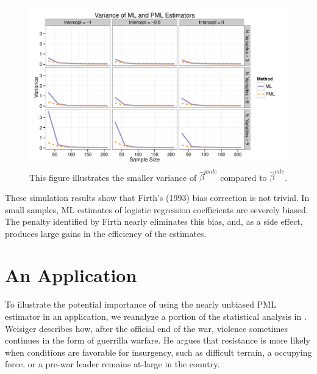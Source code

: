 \documentclass[12pt]{article}
\begin{document}
\begin{figure}[h]
\begin{center}
\includegraphics[width = \textwidth]{figs/sims-var.pdf}
\caption{This figure illustrates the smaller variance of $\hat{\beta}^{pmle}$ compared to $\hat{\beta}^{mle}$.}\label{fig:sims-var}
\end{center}
\end{figure}

These simulation results show that Firth's (1993) bias correction is not trivial. 
In small samples, ML estimates of logistic regression coefficients are severely biased.
The penalty identified by Firth nearly eliminates this bias, and, as a side effect, produces large gains in the efficiency of the estimates. 

\section*{An Application}

To illustrate the potential importance of using the nearly unbiased PML estimator in an application, we reanalyze a portion of the statistical analysis in \cite{Weisiger2014}. 
Weisiger describes how, after the official end of the war, violence sometimes continues in the form of guerrilla warfare. 
He argues that resistance is more likely when conditions are favorable for insurgency, such as difficult terrain, a occupying force, or a pre-war leader remains at-large in the country. 
\end{document}
